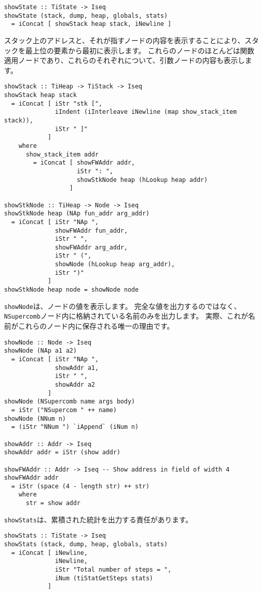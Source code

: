 \documentclass{jarticle}
\begin{document}
\begin{verbatim}
showState :: TiState -> Iseq
showState (stack, dump, heap, globals, stats)
  = iConcat [ showStack heap stack, iNewline ]
\end{verbatim}

スタック上のアドレスと、それが指すノードの内容を表示することにより、スタックを最上位の要素から最初に表示します。
これらのノードのほとんどは関数適用ノードであり、これらのそれぞれについて、引数ノードの内容も表示します。

\begin{verbatim}
showStack :: TiHeap -> TiStack -> Iseq
showStack heap stack
  = iConcat [ iStr "stk [",
              iIndent (iInterleave iNewline (map show_stack_item stack)),
              iStr " ]"
            ]
    where
      show_stack_item addr
        = iConcat [ showFWAddr addr,
                    iStr ": ",
                    showStkNode heap (hLookup heap addr)
                  ]

showStkNode :: TiHeap -> Node -> Iseq
showStkNode heap (NAp fun_addr arg_addr)
  = iConcat [ iStr "NAp ",
              showFWAddr fun_addr,
              iStr " ",
              showFWAddr arg_addr,
              iStr " (",
              showNode (hLookup heap arg_addr),
              iStr ")"
            ]
showStkNode heap node = showNode node
\end{verbatim}

\texttt{showNode}は、ノードの値を表示します。
完全な値を出力するのではなく、\texttt{NSupercomb}ノード内に格納されている名前のみを出力します。
実際、これが名前がこれらのノード内に保存される唯一の理由です。

\begin{verbatim}
showNode :: Node -> Iseq
showNode (NAp a1 a2)
  = iConcat [ iStr "NAp ",
              showAddr a1,
              iStr " ",
              showAddr a2
            ]
showNode (NSupercomb name args body)
  = iStr ("NSupercom " ++ name)
showNode (NNum n)
  = (iStr "NNum ") `iAppend` (iNum n)

showAddr :: Addr -> Iseq
showAddr addr = iStr (show addr)

showFWAddr :: Addr -> Iseq -- Show address in field of width 4
showFWAddr addr
  = iStr (space (4 - length str) ++ str)
    where
      str = show addr
\end{verbatim}

\texttt{showStats}は、累積された統計を出力する責任があります。

\begin{verbatim}
showStats :: TiState -> Iseq
showStats (stack, dump, heap, globals, stats)
  = iConcat [ iNewline,
              iNewline,
              iStr "Total number of steps = ",
              iNum (tiStatGetSteps stats)
            ]
\end{verbatim}
\end{document}
